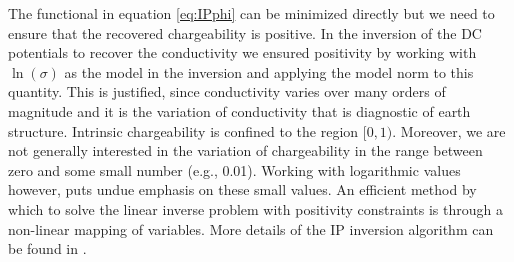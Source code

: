 The functional in equation \ref{eq:IPphi} can be minimized directly but we need to ensure that the recovered chargeability is positive. In the inversion of the DC potentials to recover the conductivity we ensured positivity by working with $\ln(\sigma)$ as the model in the inversion and applying the model norm to this quantity. This is justified, since conductivity varies over many orders of magnitude and it is the variation of conductivity that is diagnostic of earth structure. Intrinsic chargeability is confined to the region $[0,1)$. Moreover, we are not generally interested in the variation of chargeability in the range between zero and some small number (e.g., 0.01). Working with logarithmic values however, puts undue emphasis on these small values. An efficient method by which to solve the linear inverse problem with positivity constraints is through a non-linear mapping of variables. More details of the IP inversion algorithm can be found in \cite{OldenburgLi94}. 
